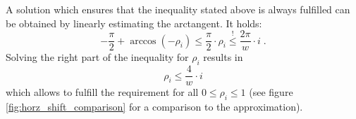 \begin{derivation}
A solution which ensures that the inequality stated above is always fulfilled can be obtained by linearly estimating the arctangent. It holds:
  $$-\frac{\pi}2 + \arccos(-\rho_i) \leq \frac{\pi}2 \cdot \rho_i \overset{!}\leq \frac{2\pi}{w} \cdot i \; .$$
Solving the right part of the inequality for $\rho_i$ results in
\begin{equation*}
  \rho_i \leq \frac{4}{w} \cdot i
\end{equation*}
which allows to fulfill the requirement for all $0 \leq \rho_i \leq 1$ (see figure \ref{fig:horz_shift_comparison} for a comparison to the approximation).
\end{derivation}
